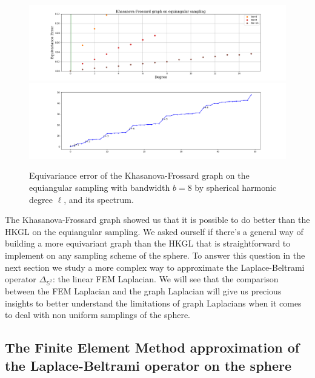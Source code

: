 \begin{figure}[h!]
	\centering
	\includegraphics[width=\textwidth]{../codes/06.Equivariance_error/KhasanovaFrossardgraphonequiangularsampling.png}
	\includegraphics[width=\textwidth]{../codes/02.HeatKernelGraphLaplacian/equiangular/equi_full_Khasanova_Frossard_eigenvalues_16.png}
	\caption{\label{fig:Equivariance error of the Frossard-Khasanove graph}Equivariance error of the Khasanova-Frossard graph on the equiangular sampling with bandwidth $b=8$ by spherical harmonic degree $\ell$, and its spectrum.}
\end{figure}

The Khasanova-Frossard graph showed us that it is possible to do better than the HKGL on the equiangular sampling. We asked ourself if there's a general way of building a more equivariant graph than the HKGL that is straightforward to implement on any sampling scheme of the sphere. To answer this question in the next section we study a more complex way to approximate the Laplace-Beltrami operator $\Delta_{\mathbb S^2}$: the linear FEM Laplacian. We will see that the comparison between the FEM Laplacian and the graph Laplacian will give us precious insights to better understand the limitations of graph Laplacians when it comes to deal with non uniform samplings of the sphere.
\subsection{The Finite Element Method approximation of the Laplace-Beltrami operator on the sphere}\label{sec:Chapter3: Using the Finite Element Method to approximate the Laplace-Beltrami operator on a manifold}

